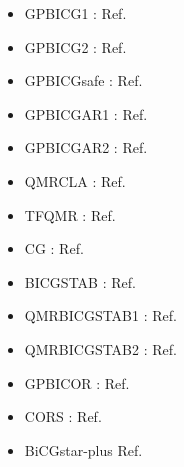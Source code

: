\begin{itemize}
\item GPBICG1 : Ref.~
\item GPBICG2 : Ref.~
\item GPBICGsafe : Ref.~
\item GPBICGAR1 : Ref.~
\item GPBICGAR2 : Ref.~
\item QMRCLA : Ref.~
\item TFQMR : Ref.~
\item CG : Ref.~
\item BICGSTAB : Ref.~
\item QMRBICGSTAB1 : Ref.~
\item QMRBICGSTAB2 : Ref.~
\item GPBICOR : Ref.~
\item CORS : Ref.~
\item BiCGstar-plus Ref.~
\end{itemize}
